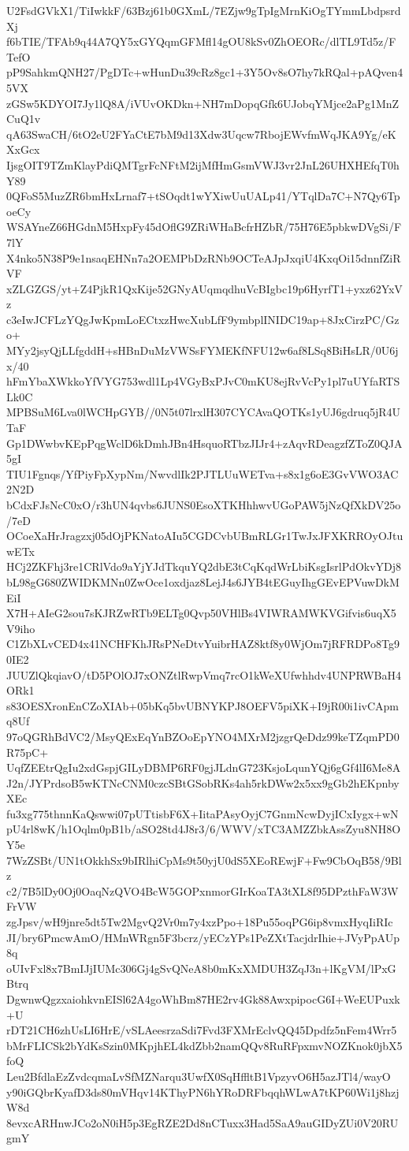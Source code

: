 U2FsdGVkX1/TiIwkkF/63Bzj61b0GXmL/7EZjw9gTpIgMrnKiOgTYmmLbdpsrdXj
f6bTIE/TFAb9q44A7QY5xGYQqmGFMfl14gOU8kSv0ZhOEORc/dlTL9Td5z/FTefO
pP9SahkmQNH27/PgDTc+wHunDu39cRz8gc1+3Y5Ov8sO7hy7kRQal+pAQven45VX
zGSw5KDYOI7Jy1lQ8A/iVUvOKDkn+NH7mDopqGfk6UJobqYMjce2aPg1MnZCuQ1v
qA63SwaCH/6tO2eU2FYaCtE7bM9d13Xdw3Uqcw7RbojEWvfmWqJKA9Yg/eKXxGcx
IjsgOIT9TZmKlayPdiQMTgrFcNFtM2ijMfHmGsmVWJ3vr2JnL26UHXHEfqT0hY89
0QFoS5MuzZR6bmHxLrnaf7+tSOqdt1wYXiwUuUALp41/YTqlDa7C+N7Qy6TpoeCy
WSAYneZ66HGdnM5HxpFy45dOflG9ZRiWHaBcfrHZbR/75H76E5pbkwDVgSi/F7lY
X4nko5N38P9e1nsaqEHNn7a2OEMPbDzRNb9OCTeAJpJxqiU4KxqOi15dnnfZiRVF
xZLGZGS/yt+Z4PjkR1QxKije52GNyAUqmqdhuVcBIgbc19p6HyrfT1+yxz62YxVz
c3eIwJCFLzYQgJwKpmLoECtxzHwcXubLfF9ymbplINIDC19ap+8JxCirzPC/Gzo+
MYy2jsyQjLLfgddH+sHBnDuMzVWSsFYMEKfNFU12w6af8LSq8BiHsLR/0U6jx/40
hFmYbaXWkkoYfVYG753wdl1Lp4VGyBxPJvC0mKU8ejRvVcPy1pl7uUYfaRTSLk0C
MPBSuM6Lva0lWCHpGYB//0N5t07lrxlH307CYCAvaQOTKs1yUJ6gdruq5jR4UTaF
Gp1DWwbvKEpPqgWclD6kDmhJBn4HsquoRTbzJIJr4+zAqvRDeagzfZToZ0QJA5gI
TIU1Fgnqs/YfPiyFpXypNm/NwvdlIk2PJTLUuWETva+s8x1g6oE3GvVWO3AC2N2D
bCdxFJsNcC0xO/r3hUN4qvbs6JUNS0EsoXTKHhhwvUGoPAW5jNzQfXkDV25o/7eD
OCoeXaHrJragzxj05dOjPKNatoAIu5CGDCvbUBmRLGr1TwJxJFXKRROyOJtuwETx
HCj2ZKFhj3re1CRlVdo9aYjYJdTkquYQ2dbE3tCqKqdWrLbiKsgIsrlPdOkvYDj8
bL98gG680ZWIDKMNn0ZwOce1oxdjaz8LejJ4s6JYB4tEGuyIhgGEvEPVuwDkMEiI
X7H+AIeG2sou7sKJRZwRTb9ELTg0Qvp50VHlBs4VIWRAMWKVGifvis6uqX5V9iho
C1ZbXLvCED4x41NCHFKhJRsPNeDtvYuibrHAZ8ktf8y0WjOm7jRFRDPo8Tg90IE2
JUUZlQkqiavO/tD5POlOJ7xONZtlRwpVmq7rcO1kWeXUfwhhdv4UNPRWBaH4ORk1
s83OESXronEnCZoXIAb+05bKq5bvUBNYKPJ8OEFV5piXK+I9jR00i1ivCApmq8Uf
97oQGRhBdVC2/MsyQExEqYnBZOoEpYNO4MXrM2jzgrQeDdz99keTZqmPD0R75pC+
UqfZEEtrQgIu2xdGspjGILyDBMP6RF0gjJLdnG723KsjoLqunYQj6gGf4lI6Me8A
J2n/JYPrdsoB5wKTNcCNM0czcSBtGSobRKs4ah5rkDWw2x5xx9gGb2hEKpnbyXEc
fu3xg775thnnKaQswwi07pUTtisbF6X+IitaPAsyOyjC7GnmNcwDyjICxIygx+wN
pU4rl8wK/h1Oqlm0pB1b/aSO28td4J8r3/6/WWV/xTC3AMZZbkAssZyu8NH8OY5e
7WzZSBt/UN1tOkkhSx9bIRlhiCpMs9t50yjU0dS5XEoREwjF+Fw9CbOqB58/9Blz
c2/7B5lDy0Oj0OaqNzQVO4BcW5GOPxnmorGIrKoaTA3tXL8f95DPzthFaW3WFrVW
zgJpsv/wH9jnre5dt5Tw2MgvQ2Vr0m7y4xzPpo+18Pu55oqPG6ip8vmxHyqIiRIc
JI/bry6PmcwAmO/HMnWRgn5F3bcrz/yECzYPs1PeZXtTacjdrIhie+JVyPpAUp8q
oUIvFxl8x7BmIJjIUMc306Gj4gSvQNeA8b0mKxXMDUH3ZqJ3n+lKgVM/lPxGBtrq
DgwnwQgzxaiohkvnEISl62A4goWhBm87HE2rv4Gk88AwxpipocG6I+WeEUPuxk+U
rDT21CH6zhUsLI6HrE/vSLAeesrzaSdi7Fvd3FXMrEclvQQ45Dpdfz5nFem4Wrr5
bMrFLICSk2bYdKsSzin0MKpjhEL4kdZbb2namQQv8RuRFpxmvNOZKnok0jbX5foQ
Leu2BfdlaEzZvdcqmaLvSfMZNarqu3UwfX0SqHffltB1VpzyvO6H5azJTl4/wayO
y90iGQbrKyafD3ds80mVHqv14KThyPN6hYRoDRFbqqhWLwA7tKP60Wi1j8hzjW8d
8evxcARHnwJCo2oN0iH5p3EgRZE2Dd8nCTuxx3Had5SaA9auGIDyZUi0V20RUgmY
